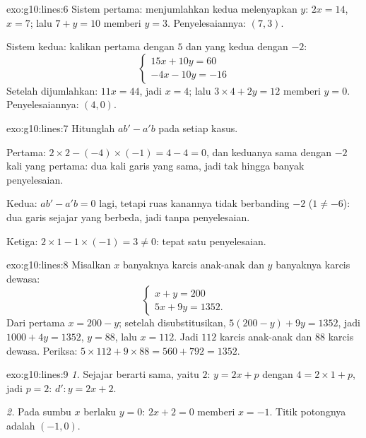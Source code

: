 \begin{solution}{exo:g10:lines:6}
Sistem pertama: menjumlahkan kedua  melenyapkan $y$: $2x = 14$,
$x = 7$; lalu $7 + y = 10$ memberi $y = 3$. Penyelesaiannya: $(7, 3)$.

Sistem kedua: kalikan  pertama dengan $5$ dan yang kedua dengan $-2$:
\[
\begin{cases}
15x + 10y = 60 \\
-4x - 10y = -16
\end{cases}
\]
Setelah dijumlahkan: $11x = 44$, jadi $x = 4$; lalu $3 \times 4 + 2y = 12$
memberi $y = 0$. Penyelesaiannya: $(4, 0)$.
\end{solution}

\begin{solution}{exo:g10:lines:7}
Hitunglah $ab' - a'b$ pada setiap kasus.

Pertama: $2 \times 2 - (-4) \times (-1) = 4 - 4 = 0$, dan 
keduanya sama dengan $-2$ kali yang pertama: dua kali garis yang sama, jadi
tak hingga banyak penyelesaian.

Kedua: $ab' - a'b = 0$ lagi, tetapi ruas kanannya tidak berbanding
$-2$ ($1 \neq -6$): dua garis sejajar yang berbeda, jadi tanpa penyelesaian.

Ketiga: $2 \times 1 - 1 \times (-1) = 3 \neq 0$: tepat satu penyelesaian.
\end{solution}

\begin{solution}{exo:g10:lines:8}
Misalkan $x$ banyaknya karcis anak-anak dan $y$ banyaknya karcis
dewasa:
\[
\begin{cases}
x + y = 200 \\
5x + 9y = 1352 .
\end{cases}
\]
Dari  pertama $x = 200 - y$; setelah disubstitusikan,
$5(200 - y) + 9y = 1352$, jadi $1000 + 4y = 1352$, $y = 88$, lalu
$x = 112$. Jadi $112$ karcis anak-anak dan $88$ karcis dewasa. Periksa:
$5 \times 112 + 9 \times 88 = 560 + 792 = 1352$.
\end{solution}

\begin{solution}{exo:g10:lines:9}
\emph{1.} Sejajar berarti  sama, yaitu $2$: $y = 2x + p$ dengan
$4 = 2 \times 1 + p$, jadi $p = 2$: $d'\colon y = 2x + 2$.

\emph{2.} Pada sumbu $x$ berlaku $y = 0$: $2x + 2 = 0$ memberi $x = -1$.
Titik potongnya adalah $(-1, 0)$.
\end{solution}


